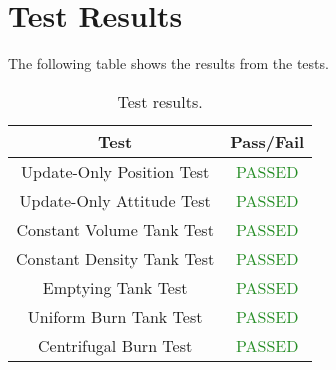 \section{Test Results}

The following table shows the results from the tests.

\begin{table}[H]
	\caption{Test results.}
	\label{tab:results}
	\centering \fontsize{10}{10}\selectfont
	\begin{tabular}{c | c } %
		\hline
		\textbf{Test} 				    & \textbf{Pass/Fail}  \\ \hline
		Update-Only Position Test  & \textcolor{ForestGreen}{PASSED}\\
		Update-Only Attitude Test  & \textcolor{ForestGreen}{PASSED}   \\ 
		Constant Volume Tank Test  &\textcolor{ForestGreen}{PASSED}  \\ 
		Constant Density Tank Test &\textcolor{ForestGreen}{PASSED}  \\ 
		Emptying Tank Test &\textcolor{ForestGreen}{PASSED}  \\ 
		Uniform Burn Tank Test  &\textcolor{ForestGreen}{PASSED}  \\ 
		Centrifugal Burn Test &\textcolor{ForestGreen}{PASSED}  \\ \hline
	\end{tabular}
\end{table}